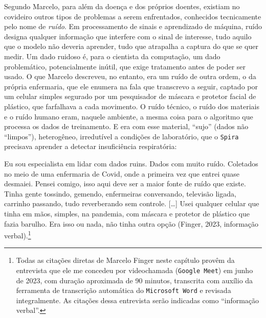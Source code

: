 Segundo Marcelo, para além da doença e dos próprios doentes, existiam no covideiro outros tipos de problemas a serem enfrentados, conhecidos tecnicamente pelo nome de \textit{ruído}. Em processamento de sinais e aprendizado de máquina, ruído designa qualquer informação que interfere com o sinal de interesse, tudo aquilo que o modelo não deveria aprender, tudo que atrapalha a captura do que se quer medir. Um dado ruidoso é, para o cientista da computação, um dado problemático, potencialmente inútil, que exige tratamento antes de poder ser usado. O que Marcelo descreveu, no entanto, era um ruído de outra ordem, o da própria enfermaria, que ele enumera na fala que transcrevo a seguir, captado por um celular simples segurado por um pesquisador de máscara e protetor facial de plástico, que farfalhava a cada movimento. O ruído técnico, o ruído dos materiais e o ruído humano eram, naquele ambiente, a mesma coisa para o algoritmo que processa os dados de treinamento. E era com esse material, \enquote{sujo} (dados não \enquote{limpos}), heterogêneo, irredutível a condições de laboratório, que o \texttt{Spira} precisava aprender a detectar insuficiência respiratória:

\begin{citacaoabnt}
Eu sou especialista em lidar com dados ruins. Dados com muito ruído. Coletados no meio de uma enfermaria de Covid, onde a primeira vez que entrei quase desmaiei. Pensei comigo, isso aqui deve ser a maior fonte de ruído que existe. Tinha gente tossindo, gemendo, enfermeiras conversando, televisão ligada, carrinho passando, tudo reverberando sem controle. [\ldots] Usei qualquer celular que tinha em mãos, simples, na pandemia, com máscara e protetor de plástico que fazia barulho. Era isso ou nada, não tinha outra opção (Finger, 2023, informação verbal).\footnote{Todas as citações diretas de Marcelo Finger neste capítulo provêm da entrevista que ele me concedeu por videochamada (\texttt{Google Meet}) em junho de 2023, com duração aproximada de 90 minutos, transcrita com auxílio da ferramenta de transcrição automática do \texttt{Microsoft Word} e revisada integralmente. As citações dessa entrevista serão indicadas como \enquote{informação verbal}.}
\end{citacaoabnt}

